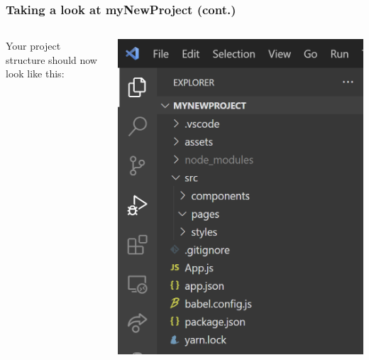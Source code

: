 \documentclass{beamer}
\begin{document}
  \begin{frame}
    \frametitle{Taking a look at myNewProject (cont.)}
    \begin{columns}[onlytextwidth]
      \begin{column}{0.4\textwidth}
        Your project structure should now look like this:
      \end{column}
      \begin{column}{0.6\textwidth}
        \centering
        \includegraphics[scale=0.4]{structure}
      \end{column}
    \end{columns}
  \end{frame}
\end{document}
